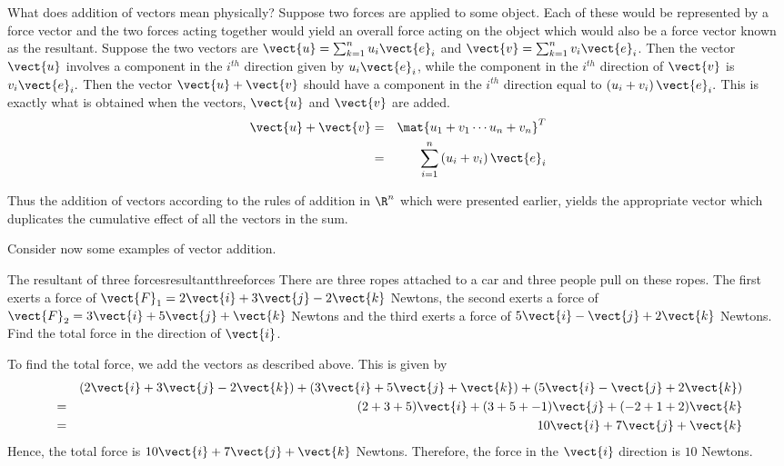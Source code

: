 What does addition of vectors mean physically? Suppose two forces are
applied to some object. Each of these would be represented by a force vector
and the two forces acting together would yield an overall force acting on
the object which would also be a force vector known as the
resultant. Suppose the two vectors are $\vect{u}=\sum_{k=1}^{n}u_{i}\vect{e}_{i}$ and $\vect{v}=\sum_{k=1}^{n}v_{i}\vect{e}_{i}$. Then the vector $\vect{u}$ involves a component in the $
i^{th}$ direction given by $u_{i}\vect{e}_{i}$, while the component in the $i^{th}$
direction of $\vect{v}$ is $v_{i}\vect{e}_{i}.$ Then the vector $\vect{u} + \vect{v}$ should have a component in the $i^{th}$
direction equal to $\left( u_{i}+v_{i}\right) \vect{e}_{i}.$ This is
exactly what is obtained when the vectors, $\vect{u}$ and $\vect{v}$ are
added.
\begin{eqnarray*}
\vect{u}+\vect{v}& =&\mat{u_{1}+v_{1} \cdots u_{n}+v_{n}}^T  \\
& =&\sum_{i=1}^{n}\left( u_{i}+v_{i}\right) \vect{e}_{i}
\end{eqnarray*}

Thus the addition of vectors according to the rules of addition in $\R^{n}$ which were presented earlier, yields the appropriate vector which
duplicates the cumulative effect of all the vectors in the sum.

Consider now some examples of vector addition.

\begin{example}{The resultant of three forces}{resultantthreeforces}
There are three ropes attached to a car and three people pull on these
ropes. The first exerts a force of $\vect{F}_1 = 
2\vect{i} + 3\vect{j} -2 \vect{k}$ Newtons, the second exerts a force of $\vect{F}_2
=
3\vect{i}+5\vect{j}+\vect{k}$ Newtons
and the third exerts a force of $5\vect{i}-\vect{j}+2\vect{k}$ Newtons. Find
the total force in the direction of $\vect{i}$.
\end{example}

\begin{solution}
To find the total force, we add the vectors as described above. 
This is given by 
\begin{eqnarray*}
&&(2\vect{i}+3\vect{j}-2\vect{k}) + (3\vect{i}+5\vect{j}+\vect{k}) + (5\vect{i}-\vect{j}+2\vect{k})\\
&=&
(2  + 3 + 5) \vect{i} + (3 + 5 + -1) \vect{j} + (-2+1+2) \vect{k} \\
&=&
10 \vect{i} + 7 \vect{j} + \vect{k}
\end{eqnarray*}
Hence, the total force is  $10\vect{i}+7\vect{j}+\vect{k}$ Newtons. Therefore, the force in the $
\vect{i}$ direction is $10$ Newtons.
\end{solution}


